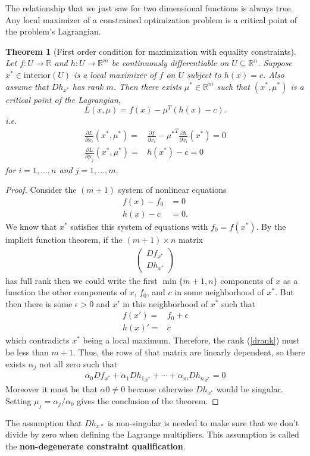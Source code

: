\documentclass[12pt,reqno]{amsart}
\newtheorem{theorem}{Theorem}[section]
\theoremstyle{definition}
\def\R{\mathbb{R}}
\renewcommand{\to}{{\rightarrow}}
\begin{document}
The relationship that we just saw for two dimensional functions is
always true. Any local maximizer of a constrained optimization problem is a
critical point of the problem's Lagrangian. 
\begin{theorem}[First order condition for maximization with equality constraints] \label{thm:econ}
  Let $f:U \to \R$ and $h: U \to \R^m$ be continuously
  differentiable on $U \subseteq \R^n$. Suppose $x^* \in
  \mathrm{interior}(U)$ is a local maximizer of $f$ on $U$ subject to 
  $h(x) = c$. Also assume that $Dh_{x^*}$ has rank $m$. Then there
  exists $\mu^* \in \R^m$ such that $(x^*, \mu^*)$ is a critical point
  of the Lagrangian,
  \[ L(x,\mu) = f(x) - \mu^T (h(x) - c). \]
  i.e.
  \begin{align*}
    \frac{\partial L}{\partial x_i}(x^*,\mu^*) = & \frac{\partial
      f}{\partial x_i} - {\mu^*}^T \frac{\partial h}{\partial
      x_i}(x^*) = 0 \\
    \frac{\partial L}{\partial \mu_j}(x^*,\mu^*) = & h(x^*) -
    c = 0
  \end{align*}
  for $i = 1, ..., n$ and $j=1,...,m$.
\end{theorem}
\begin{proof} 
  Consider the $(m+1)$ system of nonlinear equations
  \begin{align*}
  f(x) - f_0 & = 0 \\
  h(x) - c &=0.
  \end{align*}
  We know that $x^*$ satisfies this system of equations with $f_0 = f(x^*)$.
  By the implicit function theorem, if the $(m+1) \times n$ 
  matrix 
  \begin{align}
    \begin{pmatrix} Df_{x^*} \\ Dh_{x^*} \end{pmatrix} \label{drank}
  \end{align}
  has full rank then we could write the first $\min\{m+1,n\}$
  components of $x$ as a function the other components of $x$, $f_0$,
  and $c$ in some neighborhood of $x^*$. But then there is some
  $\epsilon > 0$ and $x'$ in this neighborhood of $x^*$ such that 
  \begin{align*}
    f(x') = & f_0 + \epsilon  \\
    h(x)' = & c
  \end{align*}
  which contradicts $x^*$ being a local maximum. Therefore, the rank
  (\ref{drank}) must be less than $m+1$. Thus, the rows of that matrix
  are linearly dependent, so there exists $\alpha_j$ not all zero such that 
  \begin{align*}
    \alpha_0 Df_{x^*} + \alpha_1 D{h_1}_{x^*}  + \cdots + \alpha_m
    D{h_n}_{x^*} = 0      
  \end{align*}
  Moreover it must be that $\alpha0 \neq 0$ because otherwise
  $Dh_{x^*}$ would be singular. Setting $\mu_j = \alpha_j/\alpha_0$
  gives the conclusion of the theorem.
\end{proof}
The assumption that $Dh_{x*}$ is non-singular is needed to make sure
that we don't divide by zero when defining the Lagrange
multipliers. This assumption is called the \textbf{non-degenerate
  constraint qualification}. 
\end{document}
